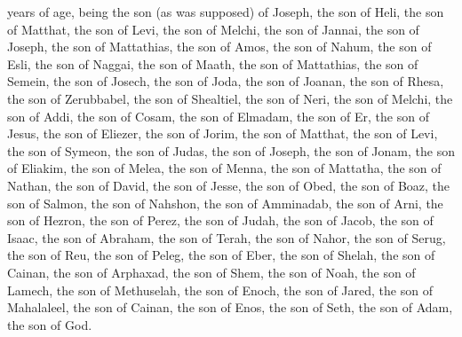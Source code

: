 years of age, being the son (as was supposed) of Joseph, the son of Heli, the son of Matthat, the son of Levi, the son of Melchi, the son of Jannai, the son of Joseph, the son of Mattathias, the son of Amos, the son of Nahum, the son of Esli, the son of Naggai, the son of Maath, the son of Mattathias, the son of Semein, the son of Josech, the son of Joda, the son of Joanan, the son of Rhesa, the son of Zerubbabel, the son of Shealtiel, the son of Neri, the son of Melchi, the son of Addi, the son of Cosam, the son of Elmadam, the son of Er, the son of Jesus, the son of Eliezer, the son of Jorim, the son of Matthat, the son of Levi, the son of Symeon, the son of Judas, the son of Joseph, the son of Jonam, the son of Eliakim, the son of Melea, the son of Menna, the son of Mattatha, the son of Nathan, the son of David, the son of Jesse, the son of Obed, the son of Boaz, the son of Salmon, the son of Nahshon, the son of Amminadab, the son of Arni, the son of Hezron, the son of Perez, the son of Judah, the son of Jacob, the son of Isaac, the son of Abraham, the son of Terah, the son of Nahor, the son of Serug, the son of Reu, the son of Peleg, the son of Eber, the son of Shelah, the son of Cainan, the son of Arphaxad, the son of Shem, the son of Noah, the son of Lamech, the son of Methuselah, the son of Enoch, the son of Jared, the son of Mahalaleel, the son of Cainan, the son of Enos, the son of Seth, the son of Adam, the son of God. 

